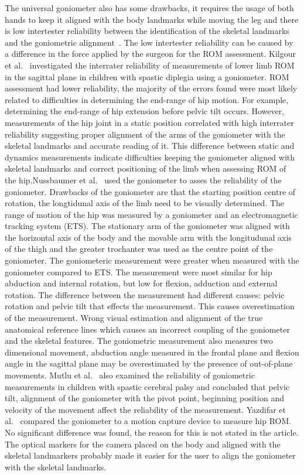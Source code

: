 \documentclass[whitelogo]{tudelft-report}
\begin{document}
{The universal goniometer also has some drawbacks, it requires the usage of both hands to keep it aligned with the body landmarks while moving the leg and there is low intertester reliability between the identification of the skeletal landmarks and the goniometric alignment~\cite{mohsin2015factors}. The low intertester reliability can be caused by a difference in the force applied by the surgeon for the ROM assessment. Kilgour et al.~\cite{kilgour2003intrarater} investigated the interrater reliability of measurements of lower limb ROM in the sagittal plane in children with spastic diplegia using a goniometer. ROM assessment had lower reliability, the majority of the errors found were most likely related to difficulties in determining the end-range of hip motion. For example, determining the end-range of hip extension before pelvic tilt occurs. However, measurements of the hip joint in a static position correlated with high interrater reliability suggesting proper alignment of the arms of the goniometer with the skeletal landmarks and accurate reading of it. This difference between static and dynamics measurements indicate difficulties keeping the goniometer aligned with skeletal landmarks and correct positioning of the limb when assessing ROM of the hip.Nussbaumer et al.~\cite{nussbaumer2010validity} used the goniometer to asses the reliability of the goniometer. Drawbacks of the goniometer are that the starting position centre of rotation, the longtidunal axis of the limb need to be visually determined. The range of motion of the hip was measured by a goniometer and an electromagnetic tracking system (ETS). The stationary arm of the goniometer was aligned with the horizontal axis of the body and the movable arm with the longitudunal axis of the thigh and the greater trochanter was used as the centre point of the goniometer. The goniometeric measurement were greater when measured with the goniometer compared to ETS. The measurement were most similar for hip abduction and internal rotation, but low for flexion, adduction and external rotation. The difference between the measurement had different causes: pelvic rotation and pelvic tilt that effects the measurement. This causes overestimation of the measurement. Wrong visual estimation and alignment of the true anatomical reference lines which causes an incorrect coupling of the goniometer and the skeletal features. The goniometric measurement also measures two dimensional movement, abduction angle measured in the frontal plane and flexion angle in the sagittal plane may be overestimated by the presence of out-of-plane movements. Mutlu et al.~\cite{mutlu2007reliability} also examined the reliability of goniometric measurements in children with spastic cerebral palsy and concluded that pelvic tilt, alignment of the goniometer with the pivot point, beginning position and velocity of the movement affect the reliability of the measurement. Yazdifar et al.~\cite{yazdifar2013evaluating} compared the goniometer to a motion capture device to measure hip ROM. No significant difference was found, the reason for this is not stated in the article. The optical markers for the camera placed on the body and aligned with the skeletal landmarkers probably made it easier for the user to align the goniometer with the skeletal landmarks.     
}
\end{document}
